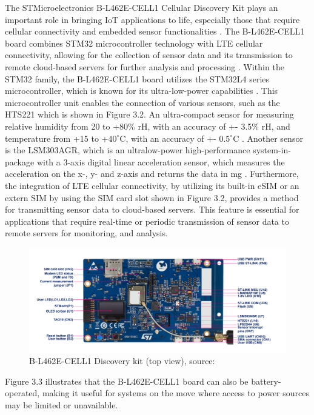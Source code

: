 The STMicroelectronics B-L462E-CELL1 Cellular Discovery Kit plays an important role in bringing IoT applications to life, especially those that require cellular connectivity and embedded sensor functionalities \cite{UM2743}.
The B-L462E-CELL1 board combines STM32 microcontroller technology with LTE cellular connectivity, allowing for the collection of sensor data and its transmission to remote cloud-based servers for further analysis and processing \cite{UM2743}.
Within the STM32 family, the B-L462E-CELL1 board utilizes the STM32L4 series microcontroller, which is known for its ultra-low-power capabilities \cite{UM2743}.
This microcontroller unit enables the connection of various sensors, such as the HTS221 which is shown in Figure 3.2. An ultra-compact sensor for measuring relative humidity from 20 to +80\% rH, with an accuracy of +- 3.5\% rH, and temperature from +15 to +$40^\circ$C, with an accuracy of +- $0.5^\circ$C \cite{DS10329, UM2743}.
Another sensor is the LSM303AGR, which is an ultralow-power high-performance system-in-package with a 3-axis digital linear acceleration sensor, which measures the acceleration on the x-, y- and z-axis and returns the data in mg \cite{DS10999}.
Furthermore, the integration of LTE cellular connectivity, by utilizing its built-in eSIM or an extern SIM by using the SIM card slot shown in Figure 3.2, provides a method for transmitting sensor data to cloud-based servers. This feature is essential for applications that require real-time or periodic transmission of sensor data to remote servers for monitoring, and analysis\cite{UM2743}.

\begin{figure}[h]
  \includegraphics[width=\linewidth]{B-L462E-CELL1_Front.png}
  \caption{B-L462E-CELL1 Discovery kit (top view), source: \cite{UM2743}}
  \label{fig:B-L462E-CELL1 Discovery kit (top view)}
\end{figure}

Figure 3.3 illustrates that the B-L462E-CELL1 board can also be battery-operated, making it useful for systems on the move where access to power sources may be limited or unavailable.

